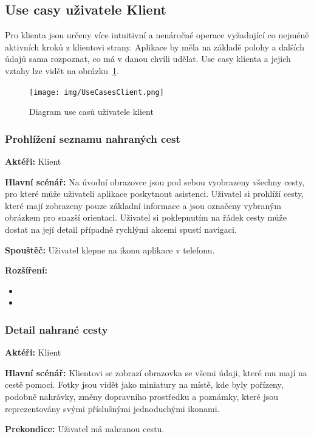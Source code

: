 \documentclass[czech,master,public,dept460,male,java,cpdeclaration]{diploma}
\newcommand{\usecase}[2]{\subsubsection{#1}\label{#2}}
\begin{document}
\subsection{Use casy uživatele Klient}
Pro klienta jsou určeny více intuitivní a nenáročné operace vyžadující co nejméně aktivních
kroků z klientovi strany. Aplikace by měla na základě polohy a dalších údajů sama rozpoznat,
co má v danou chvíli udělat. Use casy klienta a jejich vztahy lze vidět na obrázku~\ref{fig:UseCasesClient}.

\begin{figure}[H]
        \centering
                \texttt{[image: img/UseCasesClient.png]}
        \caption{Diagram use casů uživatele klient}
        \label{fig:UseCasesClient}
\end{figure}


\usecase{Prohlížení seznamu nahraných cest}{prohlizeniklient}
\textbf{Aktéři:} Klient

\vspace{0.1cm}
\noindent
\textbf{Hlavní scénář:} Na úvodní obrazovce jsou pod sebou vyobrazeny všechny cesty, pro které může
uživateli aplikace poskytnout asistenci. Uživatel si prohlíží cesty, které mají zobrazeny pouze
základní informace a jsou označeny vybraným obrázkem pro snazší orientaci. Uživatel si poklepnutím
na řádek cesty může dostat na její detail případně rychlými akcemi spustí navigaci.

\vspace{0.1cm}
\noindent
\textbf{Spouštěč:} Uživatel klepne na ikonu aplikace v telefonu.

\vspace{0.1cm}
\noindent
\textbf{Rozšíření:}
\begin{itemize}
  \item {}
  \item {}
\end{itemize}

\usecase{Detail nahrané cesty}{detailklient}
\textbf{Aktéři:} Klient

\vspace{0.1cm}
\noindent
\textbf{Hlavní scénář:} Klientovi se zobrazí obrazovka se všemi údaji, které mu mají na cestě pomoci.
Fotky jsou vidět jako miniatury na místě, kde byly pořízeny, podobně nahrávky, změny dopravního prostředku
a poznámky, které jsou reprezentovány svými příslušnými jednoduchými ikonami.

\vspace{0.1cm}
\noindent
\textbf{Prekondice:} Uživatel má nahranou cestu.
\end{document}

